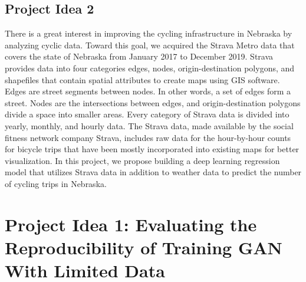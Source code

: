 \documentclass{report}
\begin{document}
\subsection{Project Idea 2}
There is a great interest in improving the cycling infrastructure in Nebraska by analyzing cyclic data. Toward this goal, we acquired the Strava Metro data that covers the state of Nebraska from January 2017 to December 2019.  Strava provides data into four categories edges, nodes, origin-destination polygons, and shapefiles that contain spatial attributes to create maps using GIS software. Edges are street segments between nodes. In other words, a set of edges form a street. Nodes are the intersections between edges, and origin-destination polygons divide a space into smaller areas. Every category of Strava data is divided into yearly, monthly, and hourly data. The Strava data, made available by the social fitness network company Strava, includes raw data for the hour-by-hour counts for bicycle trips that have been mostly incorporated into existing maps for better visualization. In this project, we propose building a deep learning regression model that utilizes Strava data in addition to weather data to predict the number of cycling trips in Nebraska. 

\section{Project Idea 1: Evaluating the Reproducibility of Training GAN With Limited Data}
\end{document}

